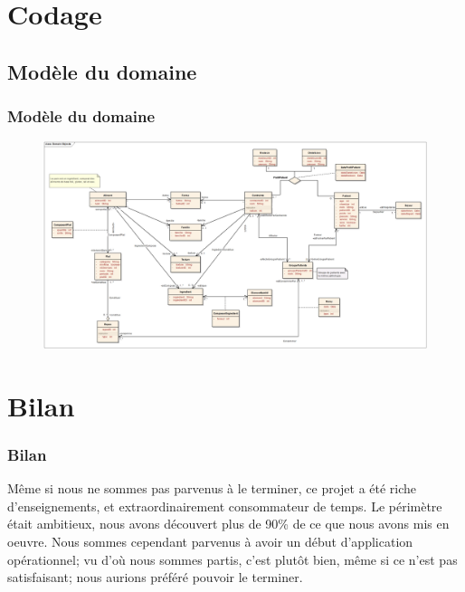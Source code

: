\documentclass{beamer}
\begin{document}
\section{Codage}
\subsection{Modèle du domaine}
\begin{frame}[label=MDD]
  \frametitle{Modèle du domaine}
  \begin{figure}
    \centering
    \includegraphics[scale=0.12]{../ModeleDuDomaine/ModeleDuDomaine.png}
  \end{figure}
\end{frame}

\section{Bilan}
\begin{frame}[label=Bilan]
  \frametitle{Bilan}
  Même si nous ne sommes pas parvenus à le terminer, ce projet a été riche d'enseignements, et extraordinairement consommateur de temps.
Le périmètre était ambitieux, nous avons découvert plus de 90\% de ce que nous avons mis en oeuvre. Nous sommes cependant parvenus à avoir un début d'application opérationnel; vu d'où nous sommes partis, c'est plutôt bien, même si ce n'est pas satisfaisant; nous aurions préféré pouvoir le terminer.

\end{frame}
\end{document}
